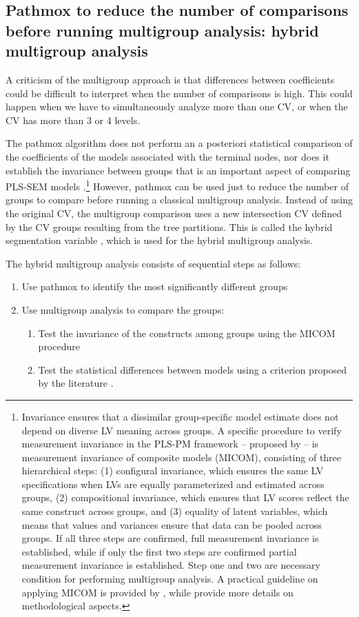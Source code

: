 \subsection{Pathmox to reduce the number of comparisons before running multigroup analysis: hybrid multigroup analysis}

A criticism of the multigroup approach is that differences between coefficients could be difficult to interpret when the number of comparisons is high.  This could happen when we have to simultaneously analyze more than one CV, or when the CV has more than 3 or 4 levels. 

The pathmox algorithm does not perform an a posteriori statistical comparison of the coefficients of the models associated with the terminal nodes, nor does it establish the invariance between groups that is an important aspect of comparing PLS-SEM models \citep{Henseler16}.\footnote{Invariance ensures that a dissimilar group-specific model estimate does not depend on diverse LV meaning across groups. A specific procedure to verify measurement invariance in the PLS-PM framework – proposed by \citet{Henseler16} – is measurement invariance of composite models (MICOM), consisting of three hierarchical steps: (1) configural invariance, which ensures the same LV specifications when LVs are equally parameterized and estimated across groups, (2) compositional invariance, which ensures that LV scores reflect the same construct across groups, and (3) equality of latent variables, which means that values and variances ensure that data can be pooled across groups. If all three steps are confirmed, full measurement invariance is established, while if only the first two steps are confirmed partial measurement invariance is established. Step one and two are necessary condition for performing multigroup analysis. A practical guideline on applying MICOM  is provided by \citep{Hair17}, while \citet{Henseler16} provide more details on methodological aspects.} However, pathmox can be used just to reduce the number of groups to compare before running a classical multigroup analysis. Instead of using the original CV, the multigroup comparison uses a new intersection CV defined by the CV groups resulting from the tree partitions. This is called the hybrid segmentation variable \citep{Lamberti21}, which is used for the hybrid multigroup analysis.  

The hybrid multigroup analysis consists of sequential steps as follows:

\begin{enumerate}
\item Use pathmox to identify the most significantly different groups
\item Use multigroup analysis to compare the groups:
\begin{enumerate}
\item Test the invariance of the constructs among groups using the MICOM procedure \citep{Henseler16}
\item Test the statistical differences between models using a criterion proposed by the literature \citep{Klesel22}.
\end{enumerate}
\end{enumerate}

